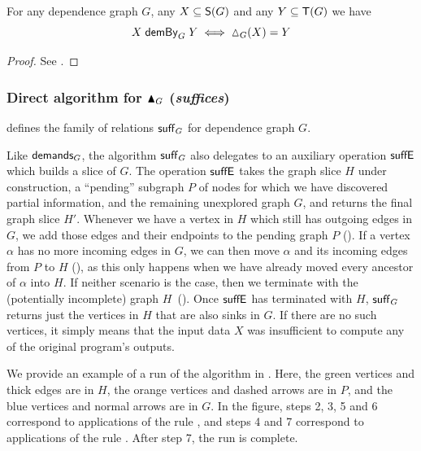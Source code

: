\begin{proposition}
   \label{prop:demandedByAlg-computes-demandedBy}
   For any dependence graph $G$, any $X \subseteq \mathsf{S}(G)$ and any $Y \subseteq \mathsf{T}(G)$ we have
   \[X \demandedByAlg{G} Y \iff \demandedByR_G(X) = Y\]
\end{proposition}
\begin{proof}
   See .
\end{proof}



\subsubsection{Direct algorithm for $\blacktriangle_{G}$ (\emph{suffices})}
\label{sec:conjugate:algorithm:suffices}

\begin{definition}[$\sufficesAlg{G}$]
\label{def:conjugate:algorithm:suffices}
 defines the family of relations $\sufficesAlg{G}$ for dependence graph $G$.
\end{definition}

Like $\mathrel{\textup{\textsf{demands}}_{G}}$, the algorithm $\sufficesAlg{G}$ also delegates to an auxiliary operation $\mathrel{\textup{\textsf{suffE}}_{}}$
which builds a slice of $G$. The operation $\mathrel{\textup{\textsf{suffE}}_{}}$ takes the graph slice $H$ under construction, a
``pending'' subgraph $P$ of nodes for which we have discovered partial information, and the remaining
unexplored graph $G$, and returns the final graph slice $H'$. Whenever we have a vertex in $H$ which still has
outgoing edges in $G$, we add those edges and their endpoints to the pending graph $P$ ().
If a vertex $\alpha$ has no more incoming edges in $G$, we can then move $\alpha$ and its incoming edges from
$P$ to $H$ (), as this only happens when we have already moved every ancestor of $\alpha$
into $H$. If neither scenario is the case, then we terminate with the (potentially incomplete) graph
$H$~(). Once $\mathrel{\textup{\textsf{suffE}}_{}}$ has terminated with $H$, $\sufficesAlg{G}$ returns just the
vertices in $H$ that are also sinks in $G$. If there are no such vertices, it simply means that the input data
$X$ was insufficient to compute any of the original program's outputs.

We provide an example of a run of the algorithm in . Here,
the green vertices and thick edges are in $H$, the orange vertices and dashed arrows are in $P$, and the
blue vertices and normal arrows are in $G$. In the figure, steps 2, 3, 5 and 6 correspond to applications
of the rule , and steps 4 and 7 correspond to applications of the rule .
After step 7, the run is complete.

